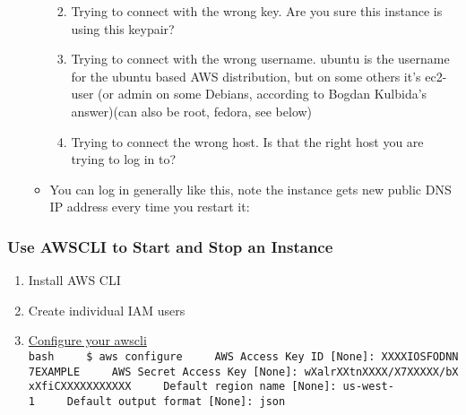 \documentclass[
]{book}
\newenvironment{Shaded}{\begin{snugshade}}{\end{snugshade}}
\newcommand{\ExtensionTok}[1]{#1}
\newcommand{\FunctionTok}[1]{\textcolor[rgb]{0.00,0.00,0.00}{#1}}
\newcommand{\NormalTok}[1]{#1}
\newcommand{\StringTok}[1]{\textcolor[rgb]{0.31,0.60,0.02}{#1}}
\newcommand{\VariableTok}[1]{\textcolor[rgb]{0.00,0.00,0.00}{#1}}
\providecommand{\tightlist}{%
  \setlength{\itemsep}{0pt}\setlength{\parskip}{0pt}}
\begin{document}
\begin{enumerate}
\begin{itemize}
    \begin{enumerate}
    \def\labelenumii{\arabic{enumii}.}
    \tightlist
    \item
      Trying to connect with the wrong key. Are you sure this instance is using this keypair?
    \item
      Trying to connect with the wrong username. ubuntu is the username for the ubuntu based AWS distribution, but on some others it's ec2-user (or admin on some Debians, according to Bogdan Kulbida's answer)(can also be root, fedora, see below)
    \item
      Trying to connect the wrong host. Is that the right host you are trying to log in to?
    \end{enumerate}
  \item
    You can log in generally like this, note the instance gets new public DNS IP address every time you restart it:
  \end{itemize}

\begin{Shaded}
\end{Shaded}
\end{enumerate}

\hypertarget{use-awscli-to-start-and-stop-an-instance}{%
\subsubsection{Use AWSCLI to Start and Stop an Instance}\label{use-awscli-to-start-and-stop-an-instance}}

\begin{enumerate}
\def\labelenumi{\arabic{enumi}.}
\tightlist
\item
  Install AWS CLI
\item
  Create individual IAM users
\item
  \href{https://docs.aws.amazon.com/cli/latest/userguide/cli-chap-getting-started.html}{Configure your awscli}
  \texttt{bash\ \ \ \ \ \$\ aws\ configure\ \ \ \ \ AWS\ Access\ Key\ ID\ {[}None{]}:\ XXXXIOSFODNN7EXAMPLE\ \ \ \ \ AWS\ Secret\ Access\ Key\ {[}None{]}:\ wXalrXXtnXXXX/X7XXXXX/bXxXfiCXXXXXXXXXXX\ \ \ \ \ Default\ region\ name\ {[}None{]}:\ us-west-1\ \ \ \ \ Default\ output\ format\ {[}None{]}:\ json}
\end{enumerate}
\end{document}
